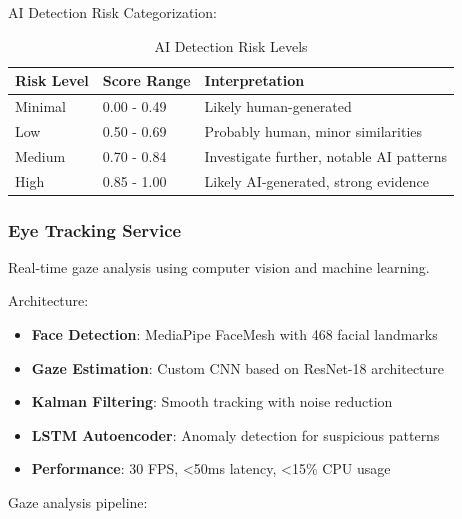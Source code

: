 \documentclass[11pt,letterpaper]{article}
\begin{document}
AI Detection Risk Categorization:

\begin{table}[H]
\centering
\begin{tabularx}{\textwidth}{llX}
\toprule
\textbf{Risk Level} & \textbf{Score Range} & \textbf{Interpretation} \\
\midrule
Minimal & 0.00 - 0.49 & Likely human-generated \\
Low & 0.50 - 0.69 & Probably human, minor similarities \\
Medium & 0.70 - 0.84 & Investigate further, notable AI patterns \\
High & 0.85 - 1.00 & Likely AI-generated, strong evidence \\
\bottomrule
\end{tabularx}
\caption{AI Detection Risk Levels}
\end{table}

\subsubsection{Eye Tracking Service}

Real-time gaze analysis using computer vision and machine learning.

Architecture:
\begin{itemize}[noitemsep]
    \item \textbf{Face Detection}: MediaPipe FaceMesh with 468 facial landmarks
    \item \textbf{Gaze Estimation}: Custom CNN based on ResNet-18 architecture
    \item \textbf{Kalman Filtering}: Smooth tracking with noise reduction
    \item \textbf{LSTM Autoencoder}: Anomaly detection for suspicious patterns
    \item \textbf{Performance}: 30 FPS, <50ms latency, <15\% CPU usage
\end{itemize}

Gaze analysis pipeline:
\end{document}
